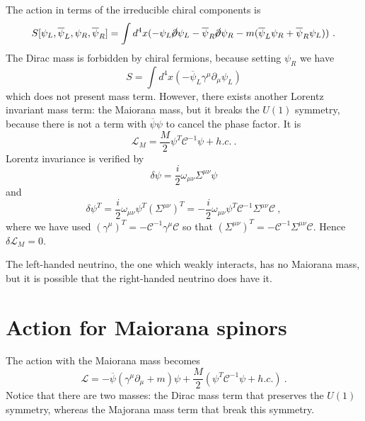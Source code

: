     The action in terms of the irreducible chiral components is 
    \begin{equation*}
        S[\psi_L, \overline \psi_L, \psi_R, \overline \psi_R] = \int d^4 x (- \psi_L \cancel{\partial} \psi_L - \overline \psi_R \cancel{\partial} \psi_R - m (\overline \psi_L \psi_R + \overline \psi_R \psi_L)) ~.
    \end{equation*}
    The Dirac mass is forbidden by chiral fermions, because setting $\psi_R$ we have 
    \begin{equation*}
        S = \int d^4 x (- \overline \psi_L \gamma^\mu \partial_\mu \psi_L)
    \end{equation*}
    which does not present mass term. However, there exists another Lorentz invariant mass term: the Maiorana mass, but it breaks the $U(1)$ symmetry, because there is not a term with $\overline \psi \psi$ to cancel the phase factor. It is 
    \begin{equation*}
        \mathcal L_M = \frac{M}{2} \psi^T \mathcal C^{-1} \psi + h.c. ~.
    \end{equation*}
    Lorentz invariance is verified by 
    \begin{equation*}
        \delta \psi = \frac{i}{2} \omega_{\mu\nu} \Sigma^{\mu\nu} \psi
    \end{equation*}
    and 
    \begin{equation*}
        \delta \psi^T = \frac{i}{2} \omega_{\mu\nu} \psi^T (\Sigma^{\mu\nu})^T = - \frac{i}{2} \omega_{\mu\nu} \psi^T \mathcal C^{-1} \Sigma^{\mu\nu} \mathcal C ~,
    \end{equation*}
    where we have used $(\gamma^\mu)^T = - \mathcal C^{-1} \gamma^\mu \mathcal C$ so that $(\Sigma^{\mu\nu})^T = - \mathcal C^{-1} \Sigma^{\mu\nu} \mathcal C$. Hence $\delta \mathcal L_M = 0$.

    The left-handed neutrino, the one which weakly interacts, has no Maiorana mass, but it is possible that the right-handed neutrino does have it.

\section{Action for Maiorana spinors}

    The action with the Maiorana mass becomes 
    \begin{equation*}
        \mathcal L = - \overline \psi (\gamma^\mu \partial_\mu + m) \psi + \frac{M}{2} (\psi^T \mathcal C^{-1} \psi + h.c.) ~.
    \end{equation*}
    Notice that there are two masses: the Dirac mass term that preserves the $U(1)$ symmetry, whereas the Majorana mass term that break this symmetry.  

